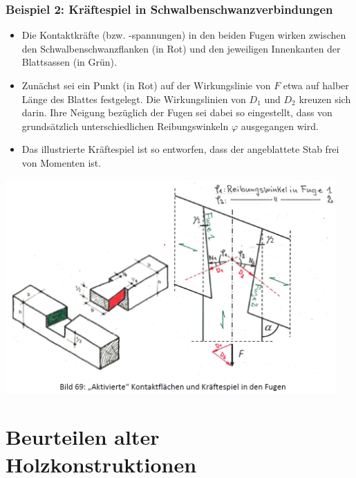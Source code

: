 \documentclass[fleqn,twoside]{article}
\begin{document}
    \subsubsection{Beispiel 2: Kräftespiel in Schwalbenschwanzverbindungen}
        \begin{minipage}{0.5\textwidth}
            \begin{itemize}
                \item Die Kontaktkräfte (bzw. -spannungen) in den beiden Fugen wirken zwischen den Schwalbenschwanzflanken (in Rot) und den jeweiligen Innenkanten der Blattsassen (in Grün). 
                \item Zunächst sei ein Punkt (in Rot) auf der Wirkungslinie von $F$ etwa auf halber Länge des Blattes festgelegt. Die Wirkungslinien von $D_1$ und $D_2$ kreuzen sich darin. Ihre Neigung bezüglich der Fugen sei dabei so eingestellt, dass von grundsätzlich unterschiedlichen Reibungswinkeln $\varphi$ ausgegangen wird. 
                \item Das illustrierte Kräftespiel ist so entworfen, dass der angeblattete Stab frei von Momenten ist.
            \end{itemize}
        \end{minipage}
        \begin{minipage}{0.5\textwidth}
            \includegraphics[width=0.95\textwidth]{Grafiken/Beurteilen alter Holzkonstruktionen/Kraftfluesse/Kraeftespiel in Schwalbenschwanzverbindungen.png}
        \end{minipage}    
        
    
\newpage
\section{Beurteilen alter Holzkonstruktionen}
\end{document}
